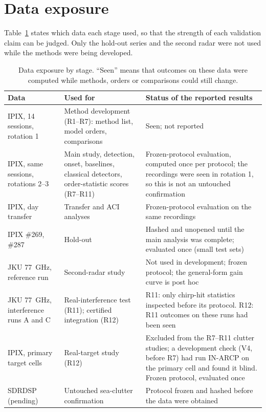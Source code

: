 \documentclass[10pt]{article}
\begin{document}
\section{Data exposure}
Table~\ref{tab:exposure} states which data each stage used, so that the strength of each validation claim can be judged. Only the hold-out series and the second radar were not used while the methods were being developed.
\begin{table}[h]
\centering\small
\caption{Data exposure by stage. ``Seen'' means that outcomes on these data were computed while methods, orders or comparisons could still change.}
\label{tab:exposure}
\begin{tabular}{p{4.3cm}p{5.2cm}p{6.2cm}}
\toprule
Data & Used for & Status of the reported results\\
\midrule
IPIX, 14 sessions, rotation 1 & Method development (R1--R7): method list, model orders, comparisons & Seen; not reported\\
IPIX, same sessions, rotations 2--3 & Main study, detection, onset, baselines, classical detectors, order-statistic scores (R7--R11) & Frozen-protocol evaluation, computed once per protocol; the recordings were seen in rotation 1, so this is not an untouched confirmation\\
IPIX, day transfer & Transfer and ACI analyses & Frozen-protocol evaluation on the same recordings\\
IPIX \#269, \#287 & Hold-out & Hashed and unopened until the main analysis was complete; evaluated once (small test sets)\\
JKU 77~GHz, reference run & Second-radar study & Not used in development; frozen protocol; the general-form gain curve is post hoc\\
JKU 77~GHz, interference runs A and C & Real-interference test (R11); certified integration (R12) & R11: only chirp-hit statistics inspected before its protocol. R12: R11 outcomes on these runs had been seen\\
IPIX, primary target cells & Real-target study (R12) & Excluded from the R7--R11 clutter studies; a development check (V4, before R7) had run IN-ARCP on the primary cell and found it blind. Frozen protocol, evaluated once\\
SDRDSP (pending) & Untouched sea-clutter confirmation & Protocol frozen and hashed before the data were obtained\\
\bottomrule
\end{tabular}
\end{table}
\end{document}
